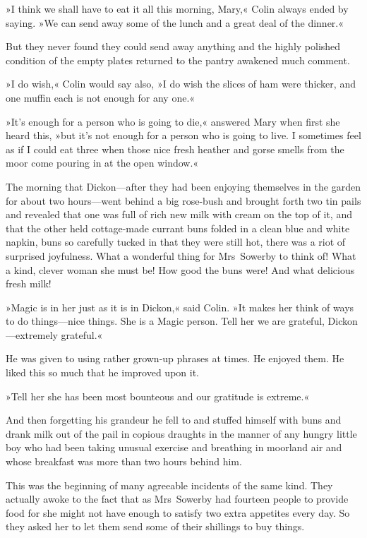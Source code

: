 »I think we shall have to eat it all this morning, Mary,« Colin always ended by saying. »We can send away some of the lunch and a great deal of the dinner.«

But they never found they could send away anything and the highly polished condition of the empty plates returned to the pantry awakened much comment.

»I do wish,« Colin would say also, »I do wish the slices of ham were thicker, and one muffin each is not enough for any one.«

»It's enough for a person who is going to die,« answered Mary when first she heard this, »but it's not enough for a person who is going to live. I sometimes feel as if I could eat three when those nice fresh heather and gorse smells from the moor come pouring in at the open window.«

The morning that Dickon—after they had been enjoying themselves in the garden for about two hours—went behind a big rose-bush and brought forth two tin pails and revealed that one was full of rich new milk with cream on the top of it, and that the other held cottage-made currant buns folded in a clean blue and white napkin, buns so carefully tucked in that they were still hot, there was a riot of surprised joyfulness. What a wonderful thing for Mrs~Sowerby to think of! What a kind, clever woman she must be! How good the buns were! And what delicious fresh milk!

»Magic is in her just as it is in Dickon,« said Colin. »It makes her think of ways to do things—nice things. She is a Magic person. Tell her we are grateful, Dickon—extremely grateful.«

He was given to using rather grown-up phrases at times. He enjoyed them. He liked this so much that he improved upon it.

»Tell her she has been most bounteous and our gratitude is extreme.«

And then forgetting his grandeur he fell to and stuffed himself with buns and drank milk out of the pail in copious draughts in the manner of any hungry little boy who had been taking unusual exercise and breathing in moorland air and whose breakfast was more than two hours behind him.

This was the beginning of many agreeable incidents of the same kind. They actually awoke to the fact that as Mrs~Sowerby had fourteen people to provide food for she might not have enough to satisfy two extra appetites every day. So they asked her to let them send some of their shillings to buy things.

